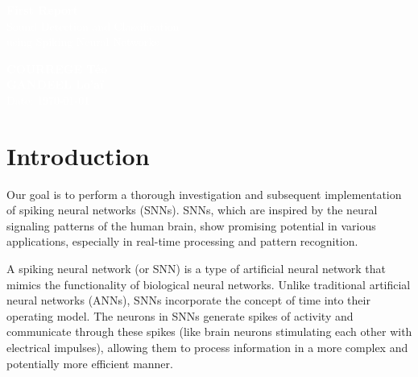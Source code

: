 \documentclass[11pt]{article}
\begin{document}
\pagecolor{darkbluegrey}
\afterpage{\nopagecolor}


\begin{titlepage}
  \begin{center}
    \textcolor{white}{\textbf{\Huge First Report}}\\ %
    \vspace{1cm}
    \textcolor{white}{\Large Sound Detection and Classification\\using Spiking Neural Networks} %
    \vspace{3cm}
  \end{center}
  \begin{center}
    \textcolor{white}{ %
      \textbf{COURREGE Téo}\\
      \textbf{GANDEEL Lo'aï}\\
      \vspace{1cm}
      \Large Date: \today}
  \end{center}
\end{titlepage}

\newpage

\tableofcontents

\pagebreak

\listoffigures

\pagebreak

\section{Introduction}

Our goal is to perform a thorough investigation and subsequent implementation of spiking neural networks (SNNs). SNNs, which are inspired by the neural signaling patterns of the human brain, show promising potential in various applications, especially in real-time processing and pattern recognition.

A spiking neural network (or SNN) is a type of artificial neural network that mimics the functionality of biological neural networks. Unlike traditional artificial neural networks (ANNs), SNNs incorporate the concept of time into their operating model. The neurons in SNNs generate spikes of activity and communicate through these spikes (like brain neurons stimulating each other with electrical impulses), allowing them to process information in a more complex and potentially more efficient manner.
\end{document}
